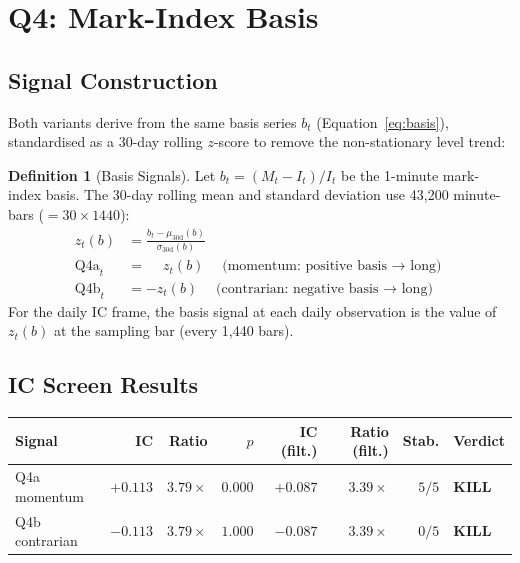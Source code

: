 \documentclass[12pt, a4paper]{article}
\theoremstyle{plain}
\theoremstyle{definition}
\newtheorem{definition}{Definition}[section]
\begin{document}
\section{Q4: Mark-Index Basis}
\label{sec:q4}

\subsection{Signal Construction}

Both variants derive from the same basis series
$b_t$ (Equation~\ref{eq:basis}), standardised as a 30-day rolling
$z$-score to remove the non-stationary level trend:

\begin{definition}[Basis Signals]
  Let $b_t = (M_t - I_t) / I_t$ be the 1-minute mark-index basis.
  The 30-day rolling mean and standard deviation use 43{,}200 minute-bars
  ($= 30 \times 1440$):
  \begin{align}
    z_t(b) &= \frac{b_t - \mu_{30\mathrm{d}}(b)}{\sigma_{30\mathrm{d}}(b)} \\
    \text{Q4a}_t &= \phantom{-}z_t(b)
      \quad\text{(momentum: positive basis $\to$ long)} \\
    \text{Q4b}_t &= -z_t(b)
      \quad\text{(contrarian: negative basis $\to$ long)}
  \end{align}
  For the daily IC frame, the basis signal at each daily observation is
  the value of $z_t(b)$ at the sampling bar (every 1{,}440 bars).
\end{definition}

\subsection{IC Screen Results}

\begin{center}
\begin{tabular}{lrrrrrrl}
\toprule
Signal & IC & Ratio & $p$ & IC (filt.) & Ratio (filt.) & Stab. & Verdict \\
\midrule
Q4a momentum   & $+0.113$ & $3.79\times$ & $0.000$ & $+0.087$ & $3.39\times$ & $5/5$ & \textbf{KILL} \\
Q4b contrarian & $-0.113$ & $3.79\times$ & $1.000$ & $-0.087$ & $3.39\times$ & $0/5$ & \textbf{KILL} \\
\bottomrule
\end{tabular}
\end{center}
\end{document}
